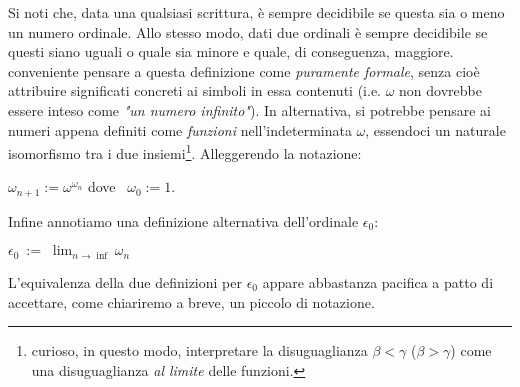 		Si noti che, data una qualsiasi scrittura, è sempre decidibile se questa sia o meno un numero ordinale. Allo stesso modo, dati due ordinali è sempre decidibile se questi siano uguali o quale sia minore e quale, di conseguenza, maggiore. \Egrave conveniente pensare a questa definizione come \emph{puramente formale}, senza cioè attribuire significati concreti ai simboli in essa contenuti (i.e. $\omega$ non dovrebbe essere inteso come \emph{"un numero infinito"}). In alternativa, si potrebbe pensare ai numeri appena definiti come \emph{funzioni} nell'indeterminata $\omega$, essendoci un naturale isomorfismo tra i due insiemi\footnote{\Egrave curioso, in questo modo, interpretare la disuguaglianza $\beta<\gamma$ ($\beta>\gamma$) come una disuguaglianza \emph{al limite} delle  funzioni.}. Alleggerendo la notazione:
	\begin{defin}
		\hfill $\displaystyle \omega_{n+1}:=\omega^{\omega_{n}}$ \quad dove \ $\omega_{0}:=1$. \hfill \phantom{Definizione}
	\end{defin}
		Infine annotiamo una definizione alternativa dell'ordinale $\epsilon_{0}$:
	\begin{defin}
		\hfill $\displaystyle{\epsilon_{0} \  := \; \lim_{n \to \inf} \omega_{n}}$ \hfill \phantom{Definizione}
	\end{defin}
		L'equivalenza della due definizioni per $\epsilon_{0}$ appare abbastanza pacifica a patto di accettare, come chiariremo a breve, un piccolo  di notazione.
		
